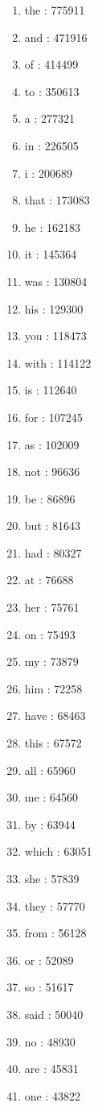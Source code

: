 \begin{tiny}
\begin{multicols}{4}
\begin{enumerate}
    \item the : 775911
	\item and : 471916
	\item of : 414499
	\item to : 350613
	\item a : 277321
	\item in : 226505
	\item i : 200689
	\item that : 173083
	\item he : 162183
	\item it : 145364
	\item was : 130804
	\item his : 129300
	\item you : 118473
	\item with : 114122
	\item is : 112640
	\item for : 107245
	\item as : 102009
	\item not : 96636
	\item be : 86896
	\item but : 81643
	\item had : 80327
	\item at : 76688
	\item her : 75761
	\item on : 75493
	\item my : 73879
	\item him : 72258
	\item have : 68463
	\item this : 67572
	\item all : 65960
	\item me : 64560
	\item by : 63944
	\item which : 63051
	\item she : 57839
	\item they : 57770
	\item from : 56128
	\item or : 52089
	\item so : 51617
	\item said : 50040
	\item no : 48930
	\item are : 45831
	\item one : 43822

\end{enumerate}
\end{multicols}
\end{tiny}
